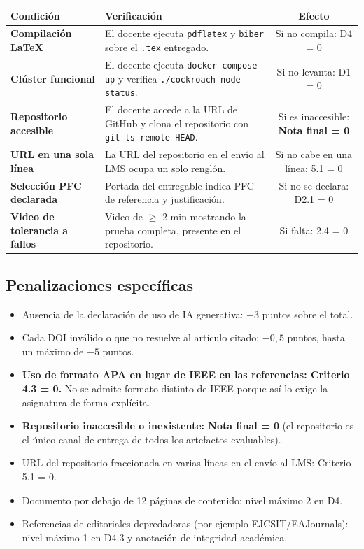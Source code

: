 \documentclass[11pt,a4paper]{article}
\begin{document}
\begin{tabularx}{\linewidth}{|>{\bfseries\color{uteqBlue}}l|>{\RaggedRight\arraybackslash}X|c|}
    \toprule
    \rowcolor{uteqSoft}
    \textbf{Condici\'on} & \textbf{Verificaci\'on} & \textbf{Efecto}\\
    \midrule
    Compilaci\'on LaTeX & El docente ejecuta \texttt{pdflatex} y \texttt{biber} sobre el \texttt{.tex} entregado. & Si no compila: D4 = 0\\
    \midrule
    Cl\'uster funcional & El docente ejecuta \texttt{docker compose up} y verifica \texttt{./cockroach node status}. & Si no levanta: D1 = 0\\
    \midrule
    Repositorio accesible & El docente accede a la URL de GitHub y clona el repositorio con \texttt{git ls-remote HEAD}. & Si es inaccesible: \textbf{Nota final = 0}\\
    \midrule
    URL en una sola l\'inea & La URL del repositorio en el env\'io al LMS ocupa un solo rengl\'on. & Si no cabe en una l\'inea: 5.1 = 0\\
    \midrule
    Selecci\'on PFC declarada & Portada del entregable indica PFC de referencia y justificaci\'on. & Si no se declara: D2.1 = 0\\
    \midrule
    Video de tolerancia a fallos & Video de $\geq$ 2 min mostrando la prueba completa, presente en el repositorio. & Si falta: 2.4 = 0\\
    \bottomrule
\end{tabularx}

\subsection{Penalizaciones espec\'ificas}

\begin{itemize}[nosep,leftmargin=1.6em]
    \item Ausencia de la declaraci\'on de uso de IA generativa: $-3$ puntos sobre el total.
    \item Cada DOI inv\'alido o que no resuelve al art\'iculo citado: $-0{,}5$ puntos, hasta un m\'aximo de $-5$ puntos.
    \item \textbf{Uso de formato APA en lugar de IEEE en las referencias: Criterio 4.3 = 0.} No se admite formato distinto de IEEE porque as\'i lo exige la asignatura de forma expl\'icita.
    \item \textbf{Repositorio inaccesible o inexistente: Nota final = 0} (el repositorio es el \'unico canal de entrega de todos los artefactos evaluables).
    \item URL del repositorio fraccionada en varias l\'ineas en el env\'io al LMS: Criterio 5.1 = 0.
    \item Documento por debajo de 12 p\'aginas de contenido: nivel m\'aximo 2 en D4.
    \item Referencias de editoriales depredadoras (por ejemplo EJCSIT/EAJournals): nivel m\'aximo 1 en D4.3 y anotaci\'on de integridad acad\'emica.
\end{itemize}
\end{document}
